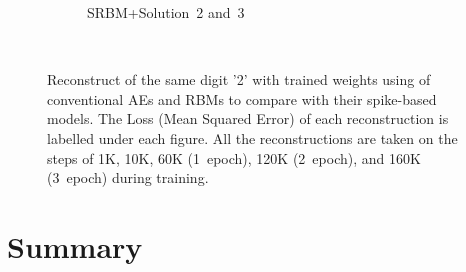 \begin{figure}
\begin{subfigure}[t]{0.32\textwidth}
		\caption{SRBM+Solution~2 and~3}
	\end{subfigure}\\
	\caption{Reconstruct of the same digit '2' with trained weights using of conventional AEs and RBMs to compare with their spike-based models.
	The Loss (Mean Squared Error) of each reconstruction is labelled under each figure.
	All the reconstructions are taken on the steps of 1K, 10K, 60K (1~epoch), 120K (2~epoch), and 160K (3~epoch) during training.}
\end{figure}

\section{Summary}

